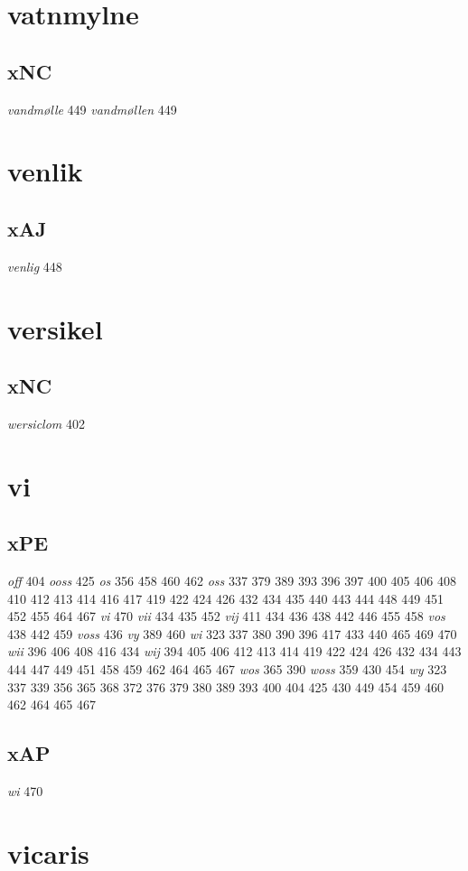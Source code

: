 \documentclass[a4paper,twocolumn]{article}
\begin{document}
\section{vatnmylne}
\label{sec:org049172e}
\subsection{xNC}
\label{sec:org637e64f}
\emph{vandmølle} 449 \emph{vandmøllen} 449 
\section{venlik}
\label{sec:orgdd68eea}
\subsection{xAJ}
\label{sec:org069f548}
\emph{venlig} 448 
\section{versikel}
\label{sec:org9593b62}
\subsection{xNC}
\label{sec:org405b4f8}
\emph{wersiclom} 402 
\section{vi}
\label{sec:orgf5d94f6}
\subsection{xPE}
\label{sec:org1c68638}
\emph{off} 404 \emph{ooss} 425 \emph{os} 356 458 460 462 \emph{oss} 337 379 389 393 396 397 400 405 406 408 410 412 413 414 416 417 419 422 424 426 432 434 435 440 443 444 448 449 451 452 455 464 467 \emph{vi} 470 \emph{vii} 434 435 452 \emph{vij} 411 434 436 438 442 446 455 458 \emph{vos} 438 442 459 \emph{voss} 436 \emph{vy} 389 460 \emph{wi} 323 337 380 390 396 417 433 440 465 469 470 \emph{wii} 396 406 408 416 434 \emph{wij} 394 405 406 412 413 414 419 422 424 426 432 434 443 444 447 449 451 458 459 462 464 465 467 \emph{wos} 365 390 \emph{woss} 359 430 454 \emph{wy} 323 337 339 356 365 368 372 376 379 380 389 393 400 404 425 430 449 454 459 460 462 464 465 467 
\subsection{xAP}
\label{sec:org30faf6c}
\emph{wi} 470 
\section{vicaris}
\label{sec:org5ff0c91}
\end{document}
